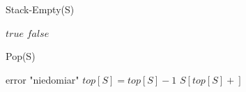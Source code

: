 \documentclass{article}
\begin{document}
	Stack-Empty(S)
	\begin{algorithmic}[1]
				\RETURN $true$
			\ELSE
				\RETURN $false$
			\ENDIF
	\end{algorithmic}
		
	Pop(S)
	\begin{algorithmic}[1]
			\STATE error "niedomiar"
			\ENDIF
			\STATE $top[S] = top[S]-1$
			\RETURN $S[top[S]+]$
	\end{algorithmic}
\end{document}
